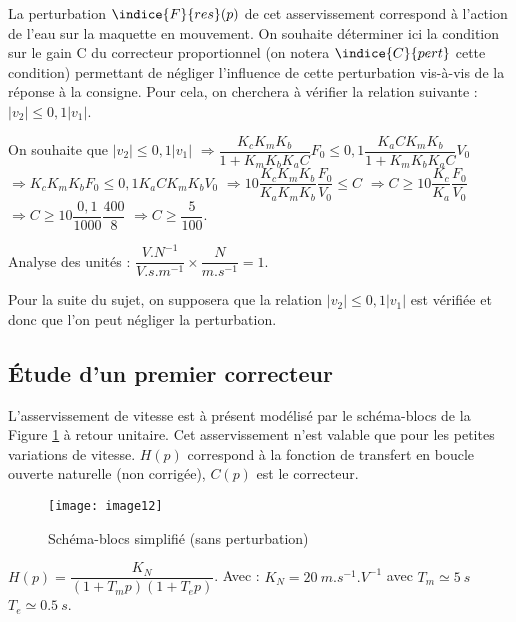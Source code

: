 La perturbation $\indice{F}{res}(p)$ de cet asservissement correspond à l'action de l'eau sur la maquette en mouvement. On souhaite déterminer ici la condition sur le gain C du correcteur proportionnel (on notera $\indice{C}{pert}$ cette condition) permettant de négliger l'influence de cette perturbation vis-à-vis de la réponse à la consigne. Pour cela, on cherchera à vérifier la relation suivante : $|v_2| \leq 0,1 |v_1|$.

\ifprof
\begin{corrige}
On souhaite que $|v_2| \leq 0,1 |v_1|$ 
$\Rightarrow \dfrac{K_c K_mK_b}{1+ K_mK_bK_a C} F_0 \leq 0,1 \dfrac{K_a C K_m K_b}{1+ K_mK_bK_a C} V_0$
$\Rightarrow K_c K_mK_b F_0 \leq 0,1 K_a C K_m K_b V_0$
$\Rightarrow 10\dfrac{K_c K_mK_b}{K_a  K_m K_b} \dfrac{F_0}{V_0} \leq  C $
$\Rightarrow C \geq 10\dfrac{K_c }{K_a } \dfrac{F_0}{V_0}  $
$\Rightarrow C \geq 10\dfrac{0,1}{1000 } \dfrac{400}{8}  $
$\Rightarrow C \geq \dfrac{5}{100} $.

Analyse des unités : $\dfrac{\si{V.N^{-1}}}{\si{V.s.m^{-1}}}\times \dfrac{\si{N}}{\si{m.s^{-1}}} = 1$.
\end{corrige}
\else
\fi

Pour la suite du sujet, on supposera que la relation $|v_2 | \leq 0,1 |v_1 |$ est vérifiée et donc que l'on peut négliger la perturbation.

\subsection{Étude d'un premier correcteur}

L'asservissement de vitesse est à présent modélisé par le schéma-blocs de la Figure \ref{fig:CCMP:2021:12} à retour unitaire. Cet asservissement n’est valable que pour les petites variations de vitesse.
$H(p)$ correspond à la fonction de transfert en boucle ouverte naturelle (non corrigée), $C(p)$ est le correcteur.
 
\begin{figure}[!h]
\centering
\texttt{[image: image12]}
\caption{\label{fig:CCMP:2021:12} Schéma-blocs simplifié (sans perturbation)}
\end{figure}  

$H(p)=\dfrac{K_N}{\left(1+T_m p\right) \left(1+T_e p\right)}$. 
Avec : $K_N=\SI{20}{m.s^{-1}.V^{-1}}$ avec $T_m\simeq \SI{5}{s}$	$T_e\simeq\SI{0,5}{s}$.
 

